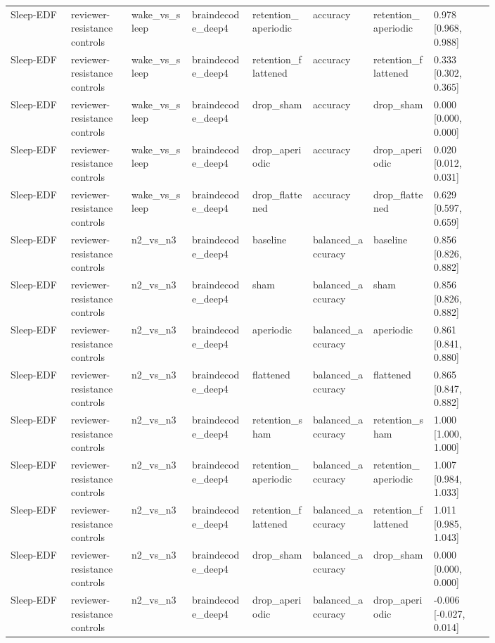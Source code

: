 \begin{longtable}{p{0.10\linewidth}p{0.10\linewidth}p{0.10\linewidth}p{0.10\linewidth}p{0.10\linewidth}p{0.10\linewidth}p{0.10\linewidth}p{0.10\linewidth}}
Sleep-EDF & reviewer-resistance controls & wake\_vs\_sleep & braindecode\_deep4 & retention\_aperiodic & accuracy & retention\_aperiodic & 0.978 [0.968, 0.988]\\
Sleep-EDF & reviewer-resistance controls & wake\_vs\_sleep & braindecode\_deep4 & retention\_flattened & accuracy & retention\_flattened & 0.333 [0.302, 0.365]\\
Sleep-EDF & reviewer-resistance controls & wake\_vs\_sleep & braindecode\_deep4 & drop\_sham & accuracy & drop\_sham & 0.000 [0.000, 0.000]\\
Sleep-EDF & reviewer-resistance controls & wake\_vs\_sleep & braindecode\_deep4 & drop\_aperiodic & accuracy & drop\_aperiodic & 0.020 [0.012, 0.031]\\
Sleep-EDF & reviewer-resistance controls & wake\_vs\_sleep & braindecode\_deep4 & drop\_flattened & accuracy & drop\_flattened & 0.629 [0.597, 0.659]\\
Sleep-EDF & reviewer-resistance controls & n2\_vs\_n3 & braindecode\_deep4 & baseline & balanced\_accuracy & baseline & 0.856 [0.826, 0.882]\\
Sleep-EDF & reviewer-resistance controls & n2\_vs\_n3 & braindecode\_deep4 & sham & balanced\_accuracy & sham & 0.856 [0.826, 0.882]\\
Sleep-EDF & reviewer-resistance controls & n2\_vs\_n3 & braindecode\_deep4 & aperiodic & balanced\_accuracy & aperiodic & 0.861 [0.841, 0.880]\\
Sleep-EDF & reviewer-resistance controls & n2\_vs\_n3 & braindecode\_deep4 & flattened & balanced\_accuracy & flattened & 0.865 [0.847, 0.882]\\
Sleep-EDF & reviewer-resistance controls & n2\_vs\_n3 & braindecode\_deep4 & retention\_sham & balanced\_accuracy & retention\_sham & 1.000 [1.000, 1.000]\\
Sleep-EDF & reviewer-resistance controls & n2\_vs\_n3 & braindecode\_deep4 & retention\_aperiodic & balanced\_accuracy & retention\_aperiodic & 1.007 [0.984, 1.033]\\
Sleep-EDF & reviewer-resistance controls & n2\_vs\_n3 & braindecode\_deep4 & retention\_flattened & balanced\_accuracy & retention\_flattened & 1.011 [0.985, 1.043]\\
Sleep-EDF & reviewer-resistance controls & n2\_vs\_n3 & braindecode\_deep4 & drop\_sham & balanced\_accuracy & drop\_sham & 0.000 [0.000, 0.000]\\
Sleep-EDF & reviewer-resistance controls & n2\_vs\_n3 & braindecode\_deep4 & drop\_aperiodic & balanced\_accuracy & drop\_aperiodic & -0.006 [-0.027, 0.014]\\

\end{longtable}
